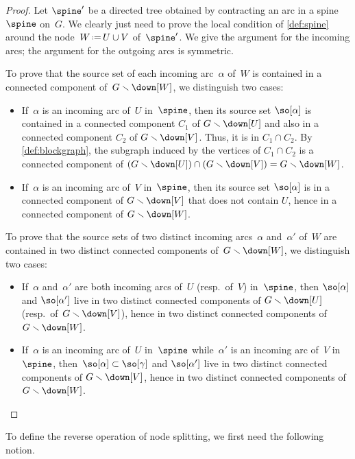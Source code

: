 \documentclass{amsart}
\theoremstyle{definition}
\newcommand{\ssm}{\smallsetminus} %
\newcommand{\eqdef}{\mbox{\,\raisebox{0.2ex}{\scriptsize\ensuremath{\mathrm:}}\ensuremath{=}\,}} %
\begin{document}
\begin{proof} 
  Let $\spine'$ be a directed tree obtained by contracting an arc in a spine $\spine$ on~$G$.
  We clearly just need to prove the local condition of \cref{def:spine} around the node~$W \eqdef U \cup V$ of~$\spine'$.
  We give the argument for the incoming arcs; the argument for the outgoing arcs is symmetric. 

  To prove that the source set of each incoming arc~$\alpha$ of~$W$ is contained in a connected component of~$G \ssm \down[W]$, we distinguish two cases:
  \begin{itemize}
    \item If~$\alpha$ is an incoming arc of~$U$ in~$\spine$, then its source set $\so[\alpha]$ is contained in a connected component $C_1$ of $G \ssm \down[U]$ and also in a connected component $C_2$ of $G \ssm \down[V]$. Thus, it is in $C_1 \cap C_2$. By \cref{def:blockgraph}, the subgraph induced by the vertices of $C_1 \cap C_2$ is a connected component of $(G \ssm \down[U]) \cap (G \ssm \down[V]) = G \ssm \down[W]$.
    \item If~$\alpha$ is an incoming arc of~$V$ in~$\spine$, then its source set $\so[\alpha]$ is in a connected component of $G \ssm \down[V]$ that does not contain $U$, hence in a connected component of $G \ssm \down[W]$.
  \end{itemize}

  To prove that the source sets of two distinct incoming arcs~$\alpha$ and~$\alpha'$ of~$W$ are contained in two distinct connected components of~$G \ssm \down[W]$, we distinguish two cases:
  \begin{itemize}
    \item If~$\alpha$ and~$\alpha'$ are both incoming arcs of~$U$ (resp.~of~$V$) in~$\spine$, then $\so[\alpha]$ and $\so[\alpha']$ live in two distinct connected components of $G \ssm \down[U]$ (resp.~of~$G \ssm \down[V]$), hence in two distinct connected components of $G\ssm \down[W]$.
    \item If~$\alpha$ is an incoming arc of~$U$ in~$\spine$ while~$\alpha'$ is an incoming arc of~$V$ in~$\spine$, then~$\so[\alpha] \subset \so[\gamma]$ and $\so[\alpha']$ live in two distinct connected components of $G \ssm \down[V]$, hence in two distinct connected components of $G\ssm \down[W]$.
    \qedhere
  \end{itemize}
\end{proof}

To define the reverse operation of node splitting, we first need the following notion.
\end{document}
